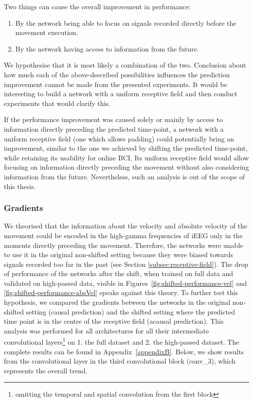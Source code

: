 Two things can cause the overall improvement in performance:
\begin{enumerate}
    \item By the network being able to focus on signals recorded directly before the movement execution.
    \item By the network having access to information from the future.
\end{enumerate}

We hypothesise that it is most likely a combination of the two.
Conclusion about how much each of the above-described possibilities influences the prediction improvement cannot be made from the presented experiments.
It would be interesting to build a network with a uniform receptive field and then conduct experiments that would clarify this.

If the performance improvement was caused solely or mainly by access to information directly preceding the predicted time-point, a network with a uniform receptive field (one which allows padding) could potentially bring an improvement, similar to the one we achieved by shifting the predicted time-point, while retaining its usability for online BCI.
Its uniform receptive field would allow focusing on information directly preceding the movement without also considering information from the future.
Nevertheless, such an analysis is out of the scope of this thesis.

    

\subsubsection{Gradients}
We theorised that the information about the velocity and absolute velocity of the movement could be encoded in the high-gamma frequencies of iEEG only in the moments directly preceding the movement.
Therefore, the networks were unable to use it in the original non-shifted setting because they were biased towards signals recorded too far in the past (see Section \ref{subsec:receptive-field}).
The drop of performance of the networks after the shift, when trained on full data and validated on high-passed data, visible in Figures~\ref{fig:shifted-performance-vel} and \ref{fig:shifted-performance-absVel} speaks against this theory. 
To further test this hypothesis, we compared the gradients between the networks in the original non-shifted setting (causal prediction) and the shifted setting where the predicted time point is in the centre of the receptive field (acausal prediction).
This analysis was performed for all architectures for all their intermediate convolutional layers\footnote{omitting the temporal and spatial convolution from the first block} on 1. the full dataset and 2. the high-passed dataset.
The complete results can be found in Appendix~\ref{appendixB}.
Below, we show results from the convolutional layer in the third convolutional block (conv\_3), which represents the overall trend. 

